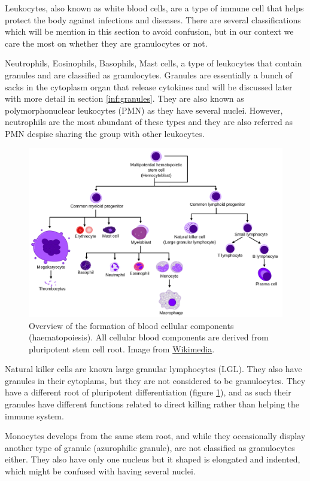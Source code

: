 Leukocytes, also known as white blood cells, are a type of immune cell that helps protect the body against infections and diseases. There are several classifications which will be mention in this section to avoid confusion, but in our context we care the most on whether they are granulocytes or not.

Neutrophils, Eosinophils, Basophils, Mast cells, a type of leukocytes that contain granules and are classified as granulocytes. Granules are essentially a bunch of sacks in the cytoplasm organ that release cytokines and will be discussed later with more detail in section \ref{inf:granules}. They are also known as polymorphonuclear leukocytes (PMN) as they have several nuclei. However, neutrophils are the most abundant of these types and they are also referred as PMN despise sharing the group with other leukocytes.

    \begin{figure}[h!]
        \centering
            \includegraphics[width=0.7\linewidth]{figures/Inflammation/Hematopoiesis_simple.svg.png} 
        \caption{Overview of the formation of blood cellular components (haematopoiesis). All cellular blood components are derived from pluripotent stem cell root. Image from \href{https://en.wikipedia.org/wiki/File:Hematopoiesis_simple.svg}{Wikimedia}.
        \label{figure:bloodformation}}
    \end{figure}  

Natural killer cells are known large granular lymphocytes (LGL). They also have granules in their cytoplams, but they are not considered to be granulocytes. They have a different root of pluripotent differentiation (figure \ref{figure:bloodformation}), and as such their granules have different functions related to direct killing rather than helping the immune system.

Monocytes develops from the same stem root, and while they occasionally display another type of granule (azurophilic granule), are not classified as granulocytes either. They also have only one nucleus but it shaped is elongated and indented, which might be confused with having several nuclei.

